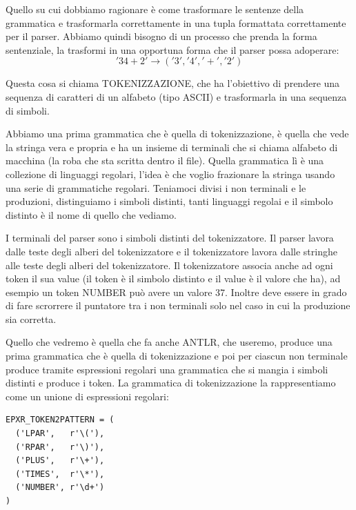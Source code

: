 Quello su cui dobbiamo ragionare è come trasformare le sentenze della grammatica e trasformarla correttamente in una tupla formattata correttamente per il parser. Abbiamo quindi bisogno di un processo che prenda la forma sentenziale, la trasformi in una opportuna forma che il parser possa adoperare:
\[
'34 + 2' \rightarrow ('3', '4', '+', '2')
\]

Questa cosa si chiama TOKENIZZAZIONE, che ha l'obiettivo di prendere una sequenza di caratteri di un alfabeto (tipo ASCII) e trasformarla in una sequenza di simboli.

Abbiamo una prima grammatica che è quella di tokenizzazione, è quella che vede la stringa vera e propria e ha un insieme di terminali che si chiama alfabeto di macchina (la roba che sta scritta dentro il file). Quella grammatica lì è una collezione di linguaggi regolari, l'idea è che voglio frazionare la stringa usando una serie di grammatiche regolari.
Teniamoci divisi i non terminali e le produzioni, distinguiamo i simboli distinti, tanti linguaggi regolai e il simbolo distinto è il nome di quello che vediamo.

I terminali del parser sono i simboli distinti del tokenizzatore. Il parser lavora dalle teste degli alberi del tokenizzatore e il tokenizzatore lavora dalle stringhe alle teste degli alberi del tokenizzatore.
Il tokenizzatore associa anche ad ogni token il sua value (il token è il simbolo distinto e il value è il valore che ha), ad esempio un token NUMBER può avere un valore 37. Inoltre deve essere in grado di fare scrorrere il puntatore tra i non terminali solo nel caso in cui la produzione sia corretta.

Quello che vedremo è quella che fa anche ANTLR, che useremo, produce una prima grammatica che è quella di tokenizzazione e poi per ciascun non terminale produce tramite espressioni regolari una grammatica che si mangia i simboli distinti e produce i token.
La grammatica di tokenizzazione la rappresentiamo come un unione di espressioni regolari:
\begin{lstlisting}
EPXR_TOKEN2PATTERN = (
  ('LPAR',   r'\('),
  ('RPAR',   r'\)'),
  ('PLUS',   r'\+'),
  ('TIMES',  r'\*'),
  ('NUMBER', r'\d+')
)
\end{lstlisting}

